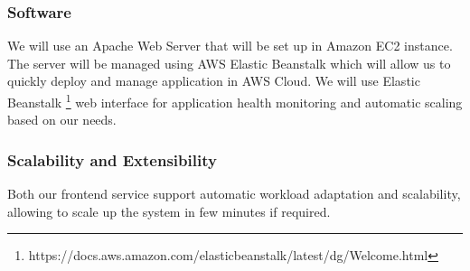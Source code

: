 \subsubsection{Software}
We will use an Apache Web Server that will be set up in Amazon EC2 instance. The server will be managed using AWS Elastic Beanstalk which will allow us to quickly deploy and manage application in AWS Cloud. We will use Elastic Beanstalk \footnote{https://docs.aws.amazon.com/elasticbeanstalk/latest/dg/Welcome.html} web interface for application health monitoring and automatic scaling based on our needs.

\subsubsection{Scalability and Extensibility}
Both our frontend service support automatic workload adaptation and scalability, allowing to scale up the system in few minutes if required. \\